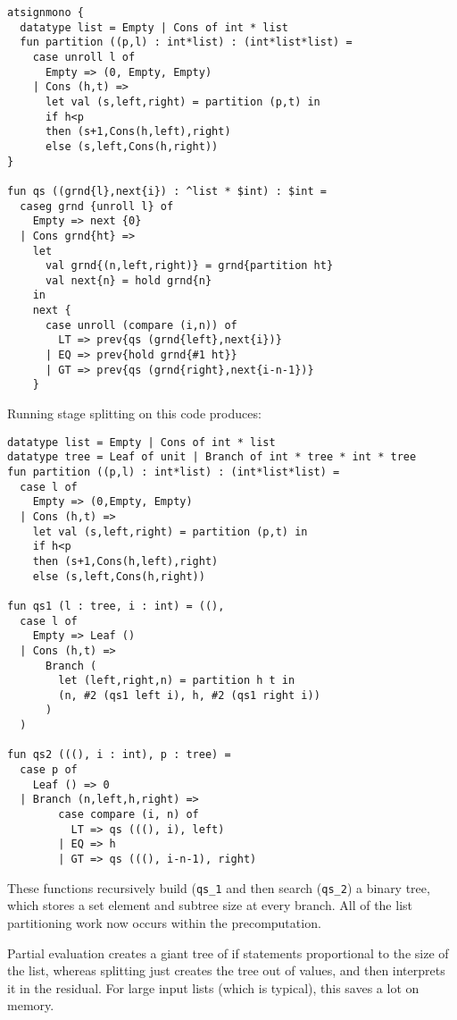 \begin{lstlisting} 
atsignmono { 
  datatype list = Empty | Cons of int * list
  fun partition ((p,l) : int*list) : (int*list*list) = 
    case unroll l of 
      Empty => (0, Empty, Empty) 
    | Cons (h,t) => 
      let val (s,left,right) = partition (p,t) in 
      if h<p 
      then (s+1,Cons(h,left),right) 
      else (s,left,Cons(h,right))
}

fun qs ((grnd{l},next{i}) : ^list * $int) : $int = 
  caseg grnd {unroll l} of 
    Empty => next {0} 
  | Cons grnd{ht} => 
    let 
      val grnd{(n,left,right)} = grnd{partition ht}
      val next{n} = hold grnd{n}
    in
    next { 
      case unroll (compare (i,n)) of
        LT => prev{qs (grnd{left},next{i})}
      | EQ => prev{hold grnd{#1 ht}}
      | GT => prev{qs (grnd{right},next{i-n-1})}
    }
\end{lstlisting}

\noindent
Running stage splitting on this code produces:

\begin{lstlisting} 
datatype list = Empty | Cons of int * list
datatype tree = Leaf of unit | Branch of int * tree * int * tree
fun partition ((p,l) : int*list) : (int*list*list) = 
  case l of 
    Empty => (0,Empty, Empty) 
  | Cons (h,t) => 
    let val (s,left,right) = partition (p,t) in 
    if h<p 
    then (s+1,Cons(h,left),right) 
    else (s,left,Cons(h,right))

fun qs1 (l : tree, i : int) = ((), 
  case l of
    Empty => Leaf ()
  | Cons (h,t) => 
      Branch (
        let (left,right,n) = partition h t in
        (n, #2 (qs1 left i), h, #2 (qs1 right i))
      )
  )

fun qs2 (((), i : int), p : tree) = 
  case p of
    Leaf () => 0
  | Branch (n,left,h,right) =>
        case compare (i, n) of 
          LT => qs (((), i), left) 
        | EQ => h 
        | GT => qs (((), i-n-1), right)

\end{lstlisting}

These functions recursively build ({\tt qs\_1} and then search ({\tt qs\_2}) a binary tree,
which stores a set element and subtree size at every branch.
All of the list partitioning work now occurs within the precomputation.

Partial evaluation creates a giant tree of if statements proportional to the size of the list,
whereas splitting just creates the tree out of values, and then interprets it in the residual.
For large input lists (which is typical), this saves a lot on memory.

